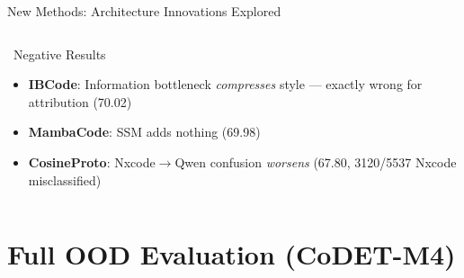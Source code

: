 \documentclass[aspectratio=169, 10pt]{beamer}
\begin{document}
\begin{frame}{New Methods: Architecture Innovations Explored}
\begin{columns}[T]
\begin{alertblock}{\faExclamationTriangle\ Negative Results}
\small
\begin{itemize}\setlength\itemsep{2pt}
    \item[\ding{55}] \textbf{IBCode}: Information bottleneck \emph{compresses} style --- exactly wrong for attribution (70.02)
    \item[\ding{55}] \textbf{MambaCode}: SSM adds nothing (69.98)
    \item[\ding{55}] \textbf{CosineProto}: Nxcode$\to$Qwen confusion \emph{worsens} (67.80, 3120/5537 Nxcode misclassified)
\end{itemize}
\end{alertblock}
\end{columns}
\end{frame}


\section{Full OOD Evaluation (CoDET-M4)}
\end{document}
